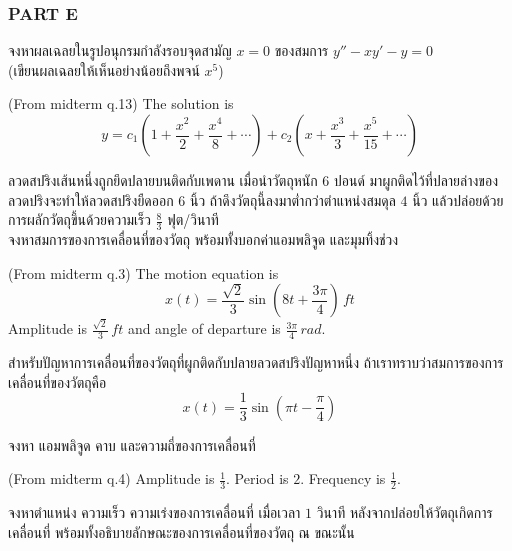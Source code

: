 \documentclass[12pt,final]{novelette} %
\begin{document}
\subsubsection*{PART E}

\begin{question}[resume]
    \item {}
    จงหาผลเฉลยในรูปอนุกรมกำลังรอบจุดสามัญ $x = 0$ ของสมการ $y'' - xy' - y = 0$ \\
    (เขียนผลเฉลยให้เห็นอย่างน้อยถึงพจน์ $x^5$) 

    \bigskip
    (From midterm q.13) The solution is
    $$
        \boxed{y = c_1\left(1 + \frac{x^2}{2} + \frac{x^4}{8} + \cdots\right) + c_2\left(x + \frac{x^3}{3} + \frac{x^5}{15} + \cdots\right)}
    $$

    \item {}
    ลวดสปริงเส้นหนึ่งถูกยึดปลายบนติดกับเพดาน
    เมื่อนำวัตถุหนัก $6$ ปอนด์ มาผูกติดไว้ที่ปลายล่างของลวดปริงจะทำให้ลวดสปริงยืดออก $6$ นิ้ว
    ถ้าดึงวัตถุนี้ลงมาต่ำกว่าตำแหน่งสมดุล $4$ นิ้ว แล้วปล่อยด้วยการผลักวัตถุขึ้นด้วยความเร็ว $\frac83$ ฟุต/วินาที \\
    จงหาสมการของการเคลื่อนที่ของวัตถุ พร้อมทั้งบอกค่าแอมพลิจูด และมุมทิ้งช่วง 

    \bigskip
    (From midterm q.3) The motion equation is
    $$
        \boxed{x(t) = \frac{\sqrt2}{3}\sin\left(8t+\frac{3\pi}{4}\right)\,\si{ft}}
    $$
    Amplitude is $\boxed{\frac{\sqrt2}3\,\si{ft}}$ and angle of departure is $\boxed{\frac{3\pi}{4}\,\si{rad}}$.

    \item {}
    สำหรับปัญหาการเคลื่อนที่ของวัตถุที่ผูกติดกับปลายลวดสปริงปัญหาหนึ่ง
    ถ้าเราทราบว่าสมการของการเคลื่อนที่ของวัตถุคือ
    $$
        x(t) = \frac13 \sin\left(\pi t - \frac\pi4\right)
    $$
    \begin{question}
        \item
        จงหา แอมพลิจูด คาบ และความถี่ของการเคลื่อนที่ 

        \bigskip
        (From midterm q.4) Amplitude is $\boxed{\frac13}$. Period is $\boxed{2}$. Frequency is $\boxed{\frac12}$.

        \item
        จงหาตำแหน่ง ความเร็ว ความเร่งของการเคลื่อนที่ เมื่อเวลา $1$ วินาที หลังจากปล่อยให้วัตถุเกิดการเคลื่อนที่
        พร้อมทั้งอธิบายลักษณะของการเคลื่อนที่ของวัตถุ ณ ขณะนั้น 


\end{question}
\end{question}
\end{document}
